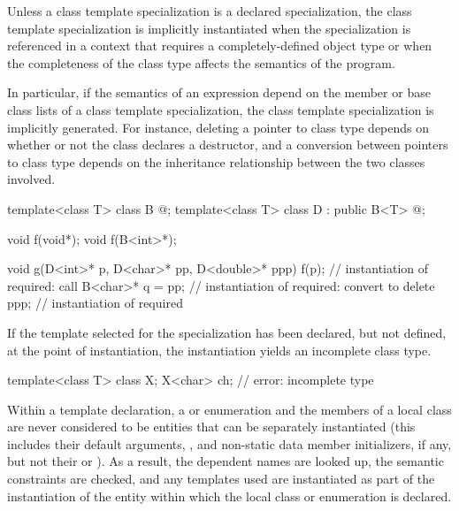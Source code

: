 \pnum
{}%
Unless a class template specialization is a declared specialization,
the class template specialization is implicitly instantiated when the
specialization is referenced in a context that requires a completely-defined
object type or when the completeness of the class type affects the semantics
of the program.
\begin{note}
In particular, if the semantics of an expression depend on the member or
base class lists of a class template specialization, the class template
specialization is implicitly generated. For instance, deleting a pointer
to class type depends on whether or not the class declares a destructor,
and a conversion between pointers to class type depends on the
inheritance relationship between the two classes involved.
\end{note}
\begin{example}
\begin{codeblock}
template<class T> class B { @\commentellip@ };
template<class T> class D : public B<T> { @\commentellip@ };

void f(void*);
void f(B<int>*);

void g(D<int>* p, D<char>* pp, D<double>* ppp) {
  f(p);             // instantiation of  required: call 
  B<char>* q = pp;  // instantiation of  required: convert  to 
  delete ppp;       // instantiation of  required
}
\end{codeblock}
\end{example}
If the template selected for the specialization
has been declared, but not defined,
at the point of instantiation,
the instantiation yields an incomplete class type.
\begin{example}
\begin{codeblock}
template<class T> class X;
X<char> ch;         // error: incomplete type 
\end{codeblock}
\end{example}
\begin{note}
Within a template declaration,
a  or enumeration and the members of
a local class are never considered to be entities that can be separately
instantiated (this includes their default arguments,
, and non-static data member
initializers, if any,
but not their  or ).
As a result, the dependent names are looked up, the
semantic constraints are checked, and any templates used are instantiated as
part of the instantiation of the entity within which the local class or
enumeration is declared.
\end{note}

